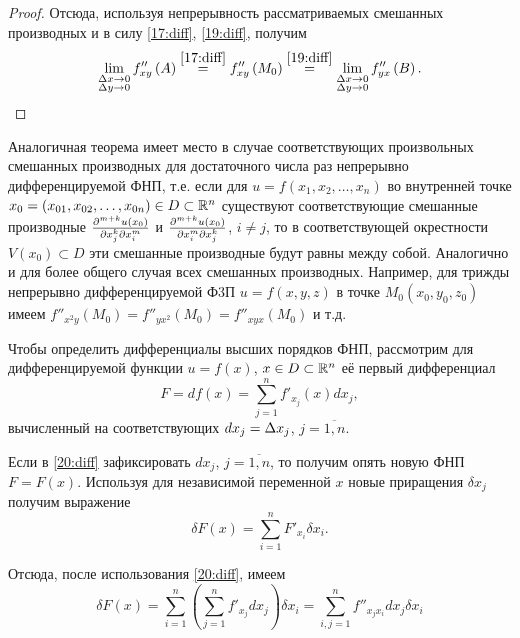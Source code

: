 \documentclass[../../main.tex]{subfiles}
\begin{document}
\begin{proof}
		Отсюда, используя непрерывность рассматриваемых смешанных 
		производных и в силу \eqref{17:diff}, \eqref{19:diff}, получим
		\[\lim_{
			\substack{\Delta x\rightarrow0\\
					\Delta y\rightarrow 0}
				}f''_{xy}\left(A\right)\overset{\eqref{17:diff}}{=}
		f''_{xy}\left(M_0\right)\overset{\eqref{19:diff}}{=}
		\lim_{
			\substack{\Delta x\rightarrow0\\
					\Delta y\rightarrow0}
				}f''_{yx}\left(B\right).\]
	\end{proof}

	\begin{remark}
		Аналогичная теорема имеет место в случае соответствующих 
		произвольных смешанных производных для достаточного числа 
		раз непрерывно дифференцируемой ФНП, т.е. если для 
		$u = f\left(x_1, x_2,\dots, x_n\right)$ во внутренней 
		точке $x_0 = \left(x_{01}, x_{02},\dots, x_{0n}\right)
		\in D\subset \mathbb{R}^n$ существуют соответствующие смешанные 
		производные $\frac{\partial ^{m+k}u\left(x_0\right)}{\partial x_j^k\partial x_i^m}$ и 
		$\frac{\partial ^{m+k}u\left(x_0\right)}{\partial x_i^m\partial x_j^k}$, $i\ne j$, 
		то в соответствующей окрестности $V\left(x_0\right)\subset D$ эти 
		смешанные производные будут равны между собой. Аналогично и для более 
		общего случая всех смешанных производных. Например, для трижды 
		непрерывно дифференцируемой Ф3П $u=f\left(x, y, z\right)$ в точке 
		$M_0\left(x_0, y_0, z_0\right)$ имеем
		$f''_{x^2y}\left(M_0\right) = f''_{yx^2}\left(M_0\right) = 
		f''_{xyx}\left(M_0\right)$ и т.д.
	\end{remark}

	Чтобы определить дифференциалы высших порядков ФНП, рассмотрим для 
	дифференцируемой функции $u=f\left(x\right)$, $x\in D\subset \mathbb{R}^n$ 
	её первый дифференциал
	\begin{equation}
		F = df\left(x\right) = \sum_{j = 1}^nf'_{x_j}\left(x\right)dx_j,
		\label{20:diff}
	\end{equation}
	вычисленный на соответствующих $dx_j = \Delta x_j$, $j = \overline{1, n}$.
	
	Если в \eqref{20:diff} зафиксировать $dx_j$, $j = \overline{1, n}$, то 
	получим опять новую ФНП $F = F(x)$. Используя для независимой переменной 
	$x$ новые приращения $\delta x_j$ получим выражение
	\[\delta F(x) = \sum_{i = 1}^nF'_{x_i}\delta x_i.\]
	
	Отсюда, после использования \eqref{20:diff}, имеем
	\begin{equation}
		\delta F(x) = \sum_{i = 1}^n\left(\sum_{j = 1}^nf'_{x_j}dx_j\right)
		\delta x_i = \sum_{i, j = 1}^nf''_{x_jx_i}dx_j\delta x_i
		\label{21:diff}
	\end{equation}
	
\end{document}
